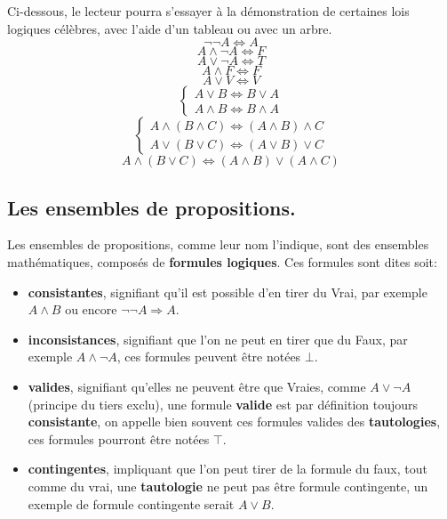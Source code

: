 \documentclass[a4paper, 12pt]{article}
\newcommand{\ffi}{\Leftrightarrow}
\newcommand{\imply}{\Rightarrow}
\numberwithin{equation}{subsection}
\begin{document}
    Ci-dessous, le lecteur pourra s'essayer à la démonstration de certaines lois logiques célèbres, avec l'aide d'un tableau ou avec un arbre. \\[1.0cm]
  \begin{equation}\neg \neg A \ffi A \end{equation}
  \begin{equation} A \land \neg A \ffi F \end{equation}
  \begin{equation} A \lor \neg A \ffi T \end{equation}
  \begin{equation} A \land F \ffi F \end{equation}
  \begin{equation} A \lor V \ffi V \end{equation}
  \begin{equation}
    \begin{cases}
      A \lor B \ffi B \lor A \\
      A \land B \ffi B \land A
    \end{cases}
  \end{equation}
  \begin{equation}
    \begin{cases}
      A \land (B \land C) \ffi (A \land B) \land C \\
      A \lor (B \lor C) \ffi (A \lor B) \lor C
    \end{cases}
  \end{equation}
  \begin{equation}A \land (B \lor C) \ffi (A \land B) \lor (A \land C) \end{equation}
  \subsection{Les ensembles de propositions.}
  Les ensembles de propositions, comme leur nom l'indique, sont des ensembles mathématiques, composés de {\bf formules logiques}.
  Ces formules sont dites soit: \\

  \begin{itemize}
  \item {\bf consistantes}, signifiant qu'il est possible d'en tirer du Vrai, par exemple $A \land B$ ou encore $\neg \neg A \imply A$.
  \item {\bf inconsistances}, signifiant que l'on ne peut en tirer que du Faux, par exemple $A \land \neg A$, ces formules peuvent être notées $\bot$.
  \item {\bf valides}, signifiant qu'elles ne peuvent être que Vraies, comme $A \lor \neg A$ (principe du tiers exclu), une formule {\bf valide} est par définition toujours {\bf consistante}, on appelle bien souvent ces formules valides des {\bf tautologies}, ces formules pourront être notées $\top$.
  \item {\bf contingentes}, impliquant que l'on peut tirer de la formule du faux, tout comme du vrai, une {\bf tautologie} ne peut pas être formule contingente,
  un exemple de formule contingente serait $A \lor B$.
  \end{itemize}
\end{document}
